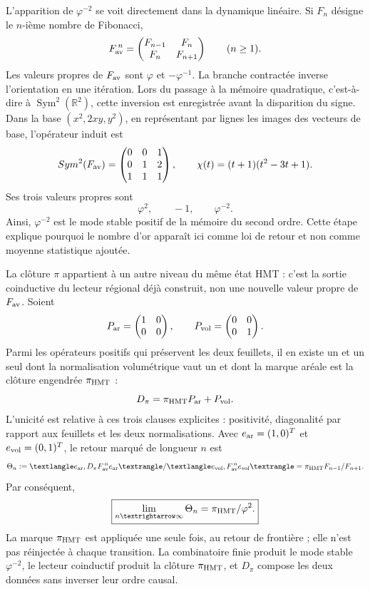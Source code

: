 L'apparition de \(\varphi^{-2}\) se voit directement dans la dynamique
linéaire. Si \(F_n\) désigne le \(n\)-ième nombre de Fibonacci,
\[
 F_{\rm av}^{\,n}
 =
 \begin{pmatrix}
  F_{n-1}&F_n\\
  F_n&F_{n+1}
 \end{pmatrix}
 \qquad(n\geq1).
\]
Les valeurs propres de \(F_{\rm av}\) sont
\(\varphi\) et \(-\varphi^{-1}\). La branche contractée inverse l'orientation en
une itération. Lors du passage à la mémoire quadratique, c'est-à-dire à
\(\operatorname{Sym}^2(\mathbb R^2)\), cette inversion est enregistrée avant la
disparition du signe. Dans la base \((x^2,2xy,y^2)\), en représentant par
lignes les images des vecteurs de base, l'opérateur induit est
\[
 \operatorname{Sym}^2(F_{\rm av})=
 \begin{pmatrix}
  0&0&1\\
  0&1&2\\
  1&1&1
 \end{pmatrix},
 \qquad
 \chi(t)=(t+1)(t^2-3t+1).
\]
Ses trois valeurs propres sont
\[
 \varphi^2,\qquad -1,\qquad \varphi^{-2}.
\]
Ainsi, \(\varphi^{-2}\) est le mode stable positif de la mémoire du second
ordre. Cette étape explique pourquoi le nombre d'or apparaît ici comme loi de
retour et non comme moyenne statistique ajoutée.

La clôture \(\pi\) appartient à un autre niveau du même état HMT : c'est la sortie
coinductive du lecteur régional déjà construit, non une nouvelle valeur propre de
\(F_{\rm av}\). Soient
\[
 P_{\rm ar}=
 \begin{pmatrix}1&0\\0&0\end{pmatrix},
 \qquad
 P_{\rm vol}=
 \begin{pmatrix}0&0\\0&1\end{pmatrix}.
\]
Parmi les opérateurs positifs qui préservent les deux feuillets, il en existe un et un
seul dont la normalisation volumétrique vaut un et dont la marque aréale est la clôture
engendrée \(\pi_{\rm HMT}\) :
\[
 D_\pi=\pi_{\rm HMT}P_{\rm ar}+P_{\rm vol}.
\]
L'unicité est relative à ces trois clauses explicites : positivité,
diagonalité par rapport aux feuillets et les deux normalisations. Avec
\(e_{\rm ar}=(1,0)^T\) et \(e_{\rm vol}=(0,1)^T\), le retour marqué de
longueur \(n\) est
\[
 \Theta_n
 :=
 \frac{\langle e_{\rm ar},
 D_\pi F_{\rm av}^{\,n}e_{\rm ar}\rangle}
 {\langle e_{\rm vol},
 F_{\rm av}^{\,n}e_{\rm vol}\rangle}
 =
 \pi_{\rm HMT}\frac{F_{n-1}}{F_{n+1}}.
\]
Par conséquent,
\[
 \boxed{\displaystyle
 \lim_{n\to\infty}\Theta_n
 =\frac{\pi_{\rm HMT}}{\varphi^2}.}
\]
La marque \(\pi_{\rm HMT}\) est appliquée une seule fois, au retour de frontière ;
elle n'est pas réinjectée à chaque transition. La combinatoire finie produit le mode
stable \(\varphi^{-2}\), le lecteur coinductif produit la clôture
\(\pi_{\rm HMT}\), et \(D_\pi\) compose les deux données sans inverser leur ordre
causal.


